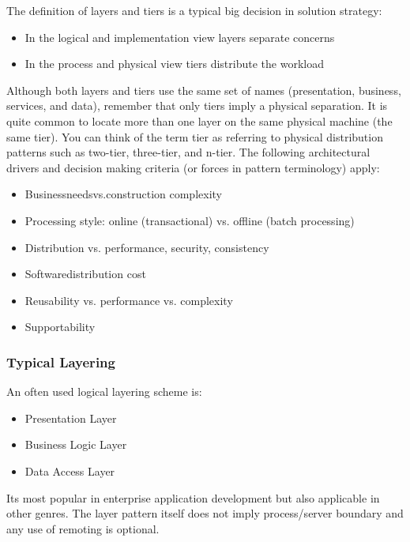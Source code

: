 \documentclass[../Main.tex]{subfiles}
\begin{document}
The definition of layers and tiers is a typical
big decision in solution strategy:
\begin{itemize}
    \item In the logical and implementation view
    layers separate concerns
    \item In the process and physical view
    tiers distribute the workload
\end{itemize}



Although both layers and tiers use the same set of names 
(presentation, business, services, and data), 
remember that only tiers imply a physical separation.
It is quite common to locate more than one layer on the
same physical machine (the same tier). You can think of
the term tier as referring to physical distribution
patterns such as two-tier, three-tier, and n-tier.
The following architectural drivers and decision making criteria (or forces in pattern terminology) apply:
\begin{itemize}
    \item Businessneedsvs.construction complexity
    \item Processing style: online (transactional) vs. offline (batch processing)
    \item Distribution vs. performance, security, consistency
    \item Softwaredistribution cost
    \item Reusability vs. performance vs. complexity
    \item Supportability
\end{itemize}

\subsubsection{Typical Layering}
An often used logical layering scheme is:
\begin{itemize}
    \item Presentation Layer
    \item Business Logic Layer
    \item Data Access Layer
\end{itemize}
Its most popular in enterprise application development but also
applicable in other genres.
The layer pattern itself does not imply process/server boundary and any use of remoting is optional.
\end{document}
